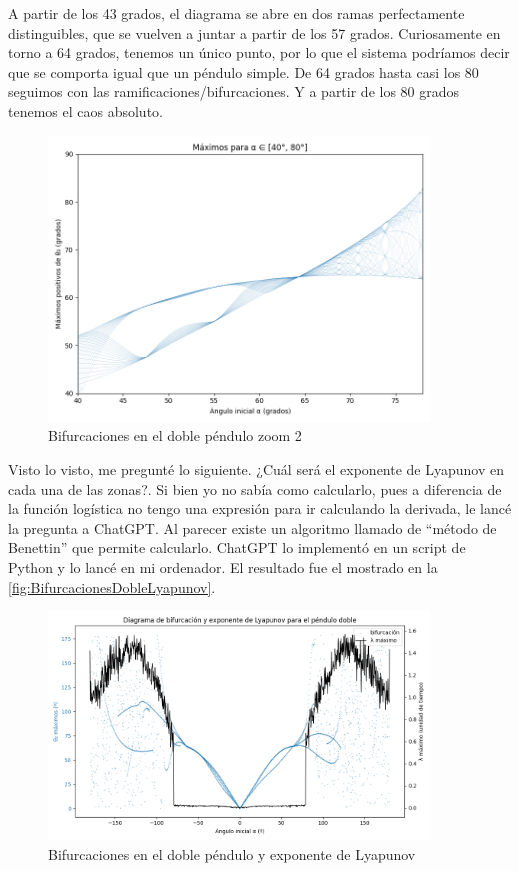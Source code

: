 \documentclass[
  10pt,
  a4paper,
  DIV=11,
  numbers=noendperiod,
  open=any]{scrreprt}
\numberwithin{equation}{chapter}
\numberwithin{equation}{section}
\renewcommand{\[}{\begin{equation}}
\renewcommand{\]}{\end{equation}}
\begin{document}
A partir de los 43 grados, el diagrama se abre en dos ramas
perfectamente distinguibles, que se vuelven a juntar a partir de los 57
grados. Curiosamente en torno a 64 grados, tenemos un único punto, por
lo que el sistema podríamos decir que se comporta igual que un péndulo
simple. De 64 grados hasta casi los 80 seguimos con las
ramificaciones/bifurcaciones. Y a partir de los 80 grados tenemos el
caos absoluto.

\begin{figure}[h]
  \centering
  \includegraphics[width=0.9\textwidth]{02-pendulo-doble/BifurcacionesDobleZona2.png}
  \caption{Bifurcaciones en el doble péndulo zoom 2}
\end{figure}



Visto lo visto, me pregunté lo siguiente. ¿Cuál será el exponente de
Lyapunov en cada una de las zonas?. Si bien yo no sabía como calcularlo,
pues a diferencia de la función logística no tengo una expresión para ir
calculando la derivada, le lancé la pregunta a ChatGPT. Al parecer
existe un algoritmo llamado de ``método de Benettin'' que permite
calcularlo. ChatGPT lo implementó en un script de Python y lo lancé en
mi ordenador. El resultado fue el mostrado en la \autoref{fig:BifurcacionesDobleLyapunov}.

\begin{figure}[h]
  \centering
  \includegraphics[width=0.9\textwidth]{02-pendulo-doble/Lyapunov.png}
  \caption{Bifurcaciones en el doble péndulo y exponente de Lyapunov}
  \label{fig:BifurcacionesDobleLyapunov}
\end{figure}
\end{document}
